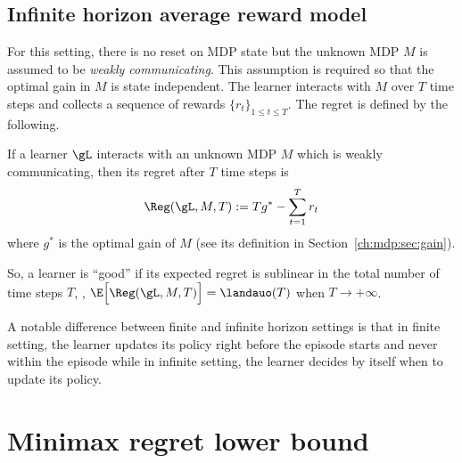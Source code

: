 \subsection{Infinite horizon average reward model}
For this setting, there is no reset on MDP state but the unknown MDP $M$ is assumed to be \emph{weakly communicating}.
This assumption is required so that the optimal gain in $M$ is state independent.
The learner interacts with $M$ over $T$ time steps and collects a sequence of rewards $\{r_t\}_{1\le t\le T}$.
The regret is defined by the following.
\begin{defn}
    If a learner $\gL$ interacts with an unknown MDP $M$ which is weakly communicating, then its regret after $T$ time steps is
    \begin{equation}
        \label{eq:rg_infinite}
        \Reg(\gL, M, T):= Tg^* -\sum_{t=1}^Tr_t
    \end{equation}
    where $g^*$ is the optimal gain of $M$ (see its definition in Section~\ref{ch:mdp:sec:gain}).
    \label{ch:rl:defn:rg_infinite}
\end{defn}
So, a learner is ``good'' if its expected regret is sublinear in the total number of time steps $T$, \ie, $\E\Big[\Reg(\gL, M, T)\Big]= \landauo(T)$ when $T\to+\infty$.

A notable difference between finite and infinite horizon settings is that in finite setting, the learner updates its policy right before the episode starts and never within the episode while in infinite setting, the learner decides by itself when to update its policy.



\section{Minimax regret lower bound}
\label{ch:rl:sec:baseline}

